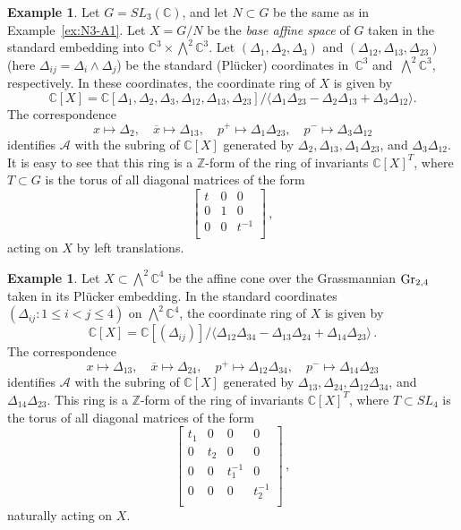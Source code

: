 \documentclass[letterpaper]{amsart}
\numberwithin{equation}{section}
\theoremstyle{definition}
\newtheorem{example}[theorem]{Example}
\def\AA{\mathcal{A}}
\def\ZZ{\mathbb{Z}}
\def\CC{\mathbb{C}}
\begin{document}
\begin{example} 
\label{ex:GmodN3-A1} 
Let $G = SL_3 (\CC)$, and let $N \subset G$ be the same as in 
Example~\ref{ex:N3-A1}. 
Let $X = G/N$ be the \emph{base affine space} of $G$ taken in the 
standard embedding into 
$\CC^3 \times \bigwedge^2 \CC^3$. 
Let $(\Delta_1, \Delta_2, \Delta_3)$ and $(\Delta_{12}, \Delta_{13}, \Delta_{23})$ 
(here $\Delta_{ij}=\Delta_i\wedge \Delta_j$) 
be the standard (Pl\"ucker) coordinates in~$\CC^3$ and~$\bigwedge^2 
\CC^3$, respectively. 
In these coordinates, 
the coordinate ring of $X$ is given by 
\[ 
\CC[X] = \CC[\Delta_1, \Delta_2, \Delta_3, \Delta_{12}, \Delta_{13}, \Delta_{23}]/ 
\langle \Delta_1 \Delta_{23} - \Delta_2 \Delta_{13} + \Delta_3 \Delta_{12}\rangle . 
\] 
The correspondence 
$$x \mapsto \Delta_2, \quad \overline x \mapsto \Delta_{13}, 
\quad p^+ \mapsto \Delta_1 \Delta_{23}, \quad p^- \mapsto \Delta_3 \Delta_{12}$$ 
identifies $\AA$ with the subring of $\CC[X]$ generated by 
$\Delta_2, \Delta_{13}, \Delta_1 \Delta_{23}$, and $\Delta_3 \Delta_{12}$. 
It is easy to see that this ring is a $\ZZ$-form of the ring of invariants 
$\CC[X]^T$, where 
$T \subset G$ is the torus of all 
diagonal matrices of the form 
$$\left[\!\!\begin{array}{ccc} 
t & 0 & 0 \\ 
0 & 1 & 0 \\ 
0 & 0 & t^{-1}\\ 
\end{array}\!\!\right] \, ,$$ 
acting on $X$ by left translations. 
\end{example} 
 
\begin{example} 
\label{ex:Gr24-A1} 
Let $X %
\subset \bigwedge^2 \CC^4$ 
be the affine cone over the Grassmannian ${\rm Gr}_{2,4}$ 
taken in its Pl\"ucker embedding. 
In the standard coordinates $(\Delta_{ij}: 1 \leq i < j \leq 4)$ 
on $\bigwedge^2 \CC^4$, 
the coordinate ring of $X$ is given by 
$$\CC[X] = \CC[(\Delta_{ij})]/ 
\langle\Delta_{12} \Delta_{34} - \Delta_{13} \Delta_{24} + \Delta_{14} 
\Delta_{23}\rangle\,. 
$$ 
The correspondence 
$$x \mapsto \Delta_{13}, \quad \overline x \mapsto \Delta_{24}, 
\quad p^+ \mapsto \Delta_{12} \Delta_{34}, \quad p^- \mapsto \Delta_{14} \Delta_{23}$$ 
identifies $\AA$ with the subring of $\CC[X]$ generated by 
$\Delta_{13}, \Delta_{24}, \Delta_{12} \Delta_{34}$, and $\Delta_{14} \Delta_{23}$. 
This ring is a $\ZZ$-form of the ring of invariants 
$\CC[X]^T$, where 
$T \subset SL_4$ is the torus of all 
diagonal matrices of the form 
$$\left[\!\!\begin{array}{cccc} 
t_1 & 0 & 0 & 0\\ 
0 & t_2 & 0 & 0\\ 
0 & 0 & t_1^{-1} & 0\\ 
0 & 0 & 0 & t_2^{-1}\\ 
\end{array}\!\!\right] \, ,$$ 
naturally acting on $X$. 
\end{example} 
 
\end{document}
